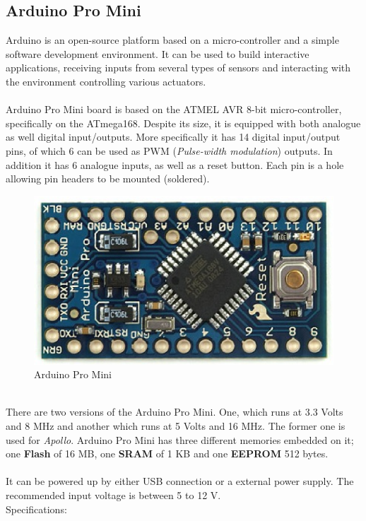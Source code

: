 \documentclass[12pt,a4paper,draft]{report}
\begin{document}
\subsection{Arduino Pro Mini}
Arduino is an open-source platform based on a micro-controller and a simple software development environment. It can be used to build interactive applications, receiving inputs from several types of sensors and interacting with the environment controlling various actuators.\\
\ \\
Arduino Pro Mini board is based on the ATMEL AVR 8-bit micro-controller, specifically on the ATmega168. Despite its size, it is equipped with both analogue as well digital input/outputs. More specifically it has 14 digital input/output pins, of which 6 can be used as PWM (\textit{Pulse-width modulation}) outputs. In addition it has 6 analogue inputs, as well as a reset button. Each pin is a hole allowing pin headers to be mounted (soldered).\ \\
\begin{figure}[H]
\centering
\includegraphics*[scale=0.4]{arduinopromini}
\caption{Arduino Pro Mini} 
\end{figure}
\ \\
There are two versions of the Arduino Pro Mini. One, which runs at 3.3 Volts and 8 MHz and another which runs at 5 Volts and 16 MHz. The former one is used for \emph{Apollo}. Arduino Pro Mini has three different memories embedded on it; one \textbf{Flash} of 16 MB, one \textbf{SRAM} of 1 KB and one \textbf{EEPROM} 512 bytes.\\
\ \\
It can be powered up by either USB connection or a external power supply. The recommended input voltage is between 5 to 12 V.
\ \\
%
Specifications:
\end{document}
